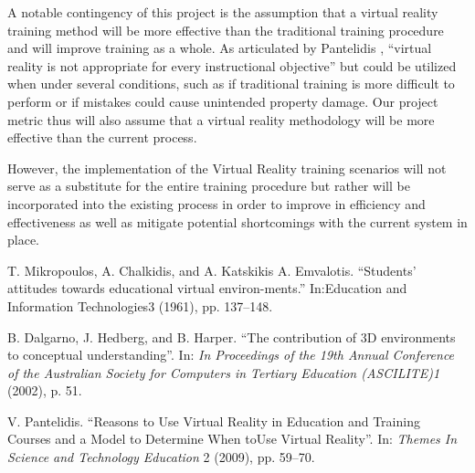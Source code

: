 \documentclass[onecolumn, draftclsnofoot,10pt, compsoc]{IEEEtran}
\begin{document}
A notable contingency of this project is the assumption that a virtual reality training method will be more effective than the traditional training procedure and will improve training as a whole. As articulated by Pantelidis \cite{1}, “virtual reality is not appropriate for every instructional objective” but could be utilized when under several conditions, such as if traditional training is more difficult to perform or if mistakes could cause unintended property damage. Our project metric thus will also assume that a virtual reality methodology will be more effective than the current process.

However, the implementation of the Virtual Reality training scenarios will not serve as a substitute for the entire training procedure but rather will be incorporated into the existing process in order to improve in efficiency and effectiveness as well as mitigate potential shortcomings with the current system in place. 


%
%
\begin{thebibliography}{00}

 T. Mikropoulos, A. Chalkidis, and A. Katskikis A. Emvalotis. “Students’ attitudes towards educational virtual environ-ments.” In:Education and Information Technologies3 (1961), pp. 137–148.

 B. Dalgarno, J. Hedberg, and B. Harper. “The contribution of 3D environments to conceptual understanding”. In: \emph{In Proceedings of the 19th Annual Conference of the Australian Society for Computers in Tertiary Education (ASCILITE)1} (2002), p. 51.

 V. Pantelidis. “Reasons to Use Virtual Reality in Education and Training Courses and a Model to Determine When toUse Virtual Reality”. In: \emph{Themes In Science and Technology Education} 2 (2009), pp. 59–70.

\end{thebibliography}
\end{document}
